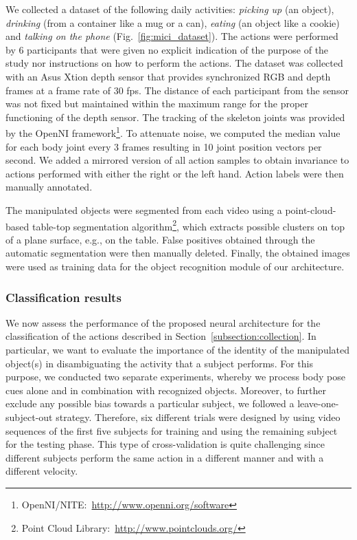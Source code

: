\documentclass[5p,times]{elsarticle}
\begin{document}
We collected a dataset of the following daily activities: \textit{picking up} (an object), \textit{drinking} (from a container like a mug or a can), \textit{eating} (an object like a cookie) and \textit{talking on the phone} (Fig.~\ref{fig:mici_dataset}).
The actions were performed by 6 participants that were given no explicit indication of the purpose of the study nor instructions on how to perform the actions.
The dataset was collected with an Asus Xtion depth sensor that provides synchronized RGB and depth frames at a frame rate of 30 fps.
The distance of each participant from the sensor was not fixed but maintained within the maximum range for the proper functioning of the depth sensor.
The tracking of the skeleton joints was provided by the OpenNI framework\footnote{OpenNI/NITE:~\href{
http://www.openni.org/software}{http://www.openni.org/software}}.
To attenuate noise, we computed the median value for each body joint every 3 frames resulting in 10 joint position vectors per second.
We added a mirrored version of all action samples to obtain invariance to actions performed with either the right or the left hand.
Action labels were then manually annotated.

The manipulated objects were segmented from each video using a point-cloud-based table-top segmentation algorithm\footnote{Point Cloud Library:~\href{http://www.pointclouds.org/}{http://www.pointclouds.org/}}, which extracts possible clusters on top of a plane surface, e.g., on the table. 
False positives obtained through the automatic segmentation were then manually deleted. 
Finally, the obtained images were used as training data for the object recognition module of our architecture. 

\subsubsection{Classification results}

We now assess the performance of the proposed neural architecture for the classification of the actions described in Section~\ref{subsection:collection}. 
In particular, we want to evaluate the importance of the identity of the manipulated object(s) in disambiguating the activity that a subject performs.
For this purpose, we conducted two separate experiments, whereby we process body pose cues alone and in combination with recognized objects.
Moreover, to further exclude any possible bias towards a particular subject, we followed a leave-one-subject-out strategy.
Therefore, six different trials were designed by using video sequences of the first five subjects for training and using the remaining subject for the testing phase. 
This type of cross-validation is quite challenging since different subjects perform the same action in a different manner and with a different velocity.
\end{document}
